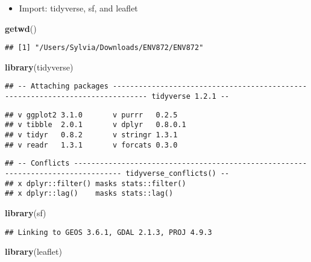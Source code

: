 \documentclass[]{article}
\newenvironment{Shaded}{\begin{snugshade}}{\end{snugshade}}
\newcommand{\KeywordTok}[1]{\textcolor[rgb]{0.13,0.29,0.53}{\textbf{#1}}}
\newcommand{\NormalTok}[1]{#1}
\providecommand{\tightlist}{%
  \setlength{\itemsep}{0pt}\setlength{\parskip}{0pt}}
\begin{document}
\begin{itemize}
\tightlist
\item
  Import: tidyverse, sf, and leaflet
\end{itemize}

\begin{Shaded}
\begin{Highlighting}[]
\KeywordTok{getwd}\NormalTok{()}
\end{Highlighting}
\end{Shaded}

\begin{verbatim}
## [1] "/Users/Sylvia/Downloads/ENV872/ENV872"
\end{verbatim}

\begin{Shaded}
\begin{Highlighting}[]
\KeywordTok{library}\NormalTok{(tidyverse)}
\end{Highlighting}
\end{Shaded}

\begin{verbatim}
## -- Attaching packages ------------------------------------------------------------------------------ tidyverse 1.2.1 --
\end{verbatim}

\begin{verbatim}
## v ggplot2 3.1.0       v purrr   0.2.5  
## v tibble  2.0.1       v dplyr   0.8.0.1
## v tidyr   0.8.2       v stringr 1.3.1  
## v readr   1.3.1       v forcats 0.3.0
\end{verbatim}

\begin{verbatim}
## -- Conflicts --------------------------------------------------------------------------------- tidyverse_conflicts() --
## x dplyr::filter() masks stats::filter()
## x dplyr::lag()    masks stats::lag()
\end{verbatim}

\begin{Shaded}
\begin{Highlighting}[]
\KeywordTok{library}\NormalTok{(sf)}
\end{Highlighting}
\end{Shaded}

\begin{verbatim}
## Linking to GEOS 3.6.1, GDAL 2.1.3, PROJ 4.9.3
\end{verbatim}

\begin{Shaded}
\begin{Highlighting}[]
\KeywordTok{library}\NormalTok{(leaflet)}
\end{Highlighting}
\end{Shaded}
\end{document}

